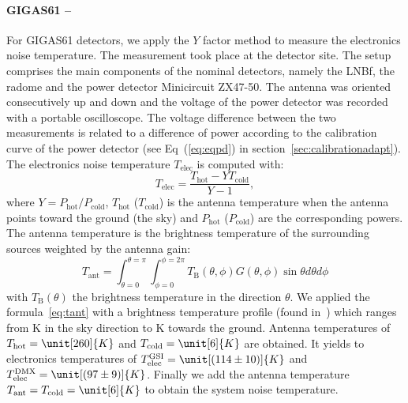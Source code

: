 \paragraph{GIGAS61 --}
For GIGAS61 detectors,  we apply the $Y$ factor  method to measure the
electronics  noise  temperature. The  measurement  took  place at  the
detector site.  The setup comprises the main components of the nominal
detectors,  namely  the  LNBf,  the  radome  and  the  power  detector
Minicircuit ZX47-50.   The antenna  was oriented consecutively  up and
down  and  the voltage  of  the power  detector  was  recorded with  a
portable  oscilloscope.   The   voltage  difference  between  the  two
measurements  is related  to a  difference of  power according  to the
calibration curve  of the power detector  (see Eq~(\eqref{eq:eqpd}) in
section~\ref{sec:calibrationadapt}).      The     electronics    noise
temperature $T_\text{elec}$ is computed with:
\begin{equation}
	T_{\text{elec}} = \frac{T_{\text{hot}} - YT_{\text{cold}}}{Y-1},
\end{equation}
where    $Y   =    P_{\text{hot}}/P_{\text{cold}}$,   $T_{\text{hot}}$
($T_{\text{cold}}$) is the antenna temperature when the antenna points
toward the  ground (the sky)  and $P_{\text{hot}}$ ($P_{\text{cold}}$)
are  the   corresponding  powers.  The  antenna   temperature  is  the
brightness  temperature of  the  surrounding sources  weighted by  the
antenna gain:
\begin{equation}
T_{\text{ant}} = \int_{\theta =  0}^{\theta = \pi}\int_{\phi = 0}^{\phi =2\pi} T_{\text{B}}(\theta, \phi) G(\theta,\phi) \sin{\theta} d\theta d\phi
\label{eq:tant}
\end{equation}
with   $T_{\text{B}}(\theta)$  the   brightness  temperature   in  the
direction  $\theta$.  We applied  the  formula~\eqref{eq:tant} with  a
brightness  temperature  profile  (found  in~\cite{otoshidanslacolle})
which ranges  from \unit[4]{K} in  the sky direction  to \unit[270]{K}
towards  the   ground.  Antenna  temperatures   of  $T_{\text{hot}}  =
\unit[260]{K}$  and $T_{\text{cold}} =  \unit[6]{K}$ are  obtained. It
yields to electronics  temperatures of $T^{\text{GSI}}_{\text{elec}} =
\unit[(114\pm    10)]{K}$    and    $T^{\text{DMX}}_{\text{elec}}    =
\unit[(97\pm  9)]{K}$.    Finally  we  add   the  antenna  temperature
$T_{\text{ant}} = T_{\text{cold}} =  \unit[6]{K}$ to obtain the system
noise temperature.
